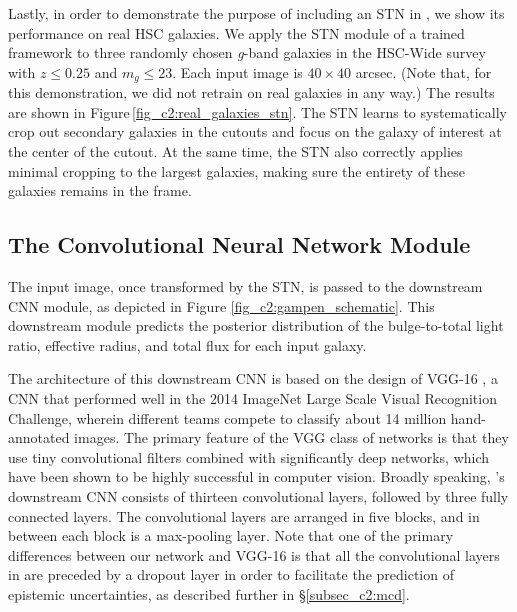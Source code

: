 Lastly, in order to demonstrate the purpose of including an STN in \gampen{}, we show its performance on real HSC galaxies. We apply the STN module of a trained \gampen{} framework to three randomly chosen \textit{g}-band galaxies in the HSC-Wide survey with $z \leq 0.25$ and $m_g \leq 23$. Each input image is $40 \times 40$ arcsec. (Note that, for this demonstration, we did not retrain \gampen{} on real galaxies in any way.) The results are shown in Figure\,\ref{fig_c2:real_galaxies_stn}. The STN learns to systematically crop out secondary galaxies in the cutouts and focus on the galaxy of interest at the center of the cutout. At the same time, the STN also correctly applies minimal cropping to the largest galaxies, making sure the entirety of these galaxies remains in the frame. 

\subsection{The Convolutional Neural Network Module} \label{subsec_c2:cnn}

The input image, once transformed by the STN, is passed to the downstream CNN module, as depicted in Figure \ref{fig_c2:gampen_schematic}. This downstream module predicts the posterior distribution of the bulge-to-total light ratio, effective radius, and total flux for each input galaxy. 

The architecture of this downstream CNN is based on the design of VGG-16 \citep{vgg}, a CNN that performed well in the 2014 ImageNet Large Scale Visual Recognition Challenge, wherein different teams compete to classify about 14 million hand-annotated images. The primary feature of the VGG class of networks is that they use tiny convolutional filters combined with significantly deep networks, which have been shown to be highly successful in computer vision. Broadly speaking, \gampen{}'s downstream CNN consists of thirteen convolutional layers, followed by three fully connected layers. The convolutional layers are arranged in five blocks, and in between each block is a max-pooling layer. Note that one of the primary differences between our network and VGG-16 is that all the convolutional layers in \gampen{} are preceded by a dropout layer in order to facilitate the prediction of epistemic uncertainties, as described further in \S \ref{subsec_c2:mcd}. 

